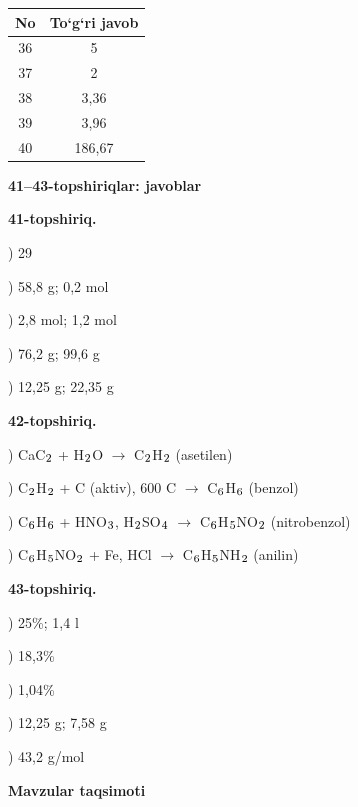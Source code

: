 \documentclass[11pt,a4paper]{article}
\renewcommand{\textsubscript}[1]{\ensuremath{_{\text{\fontsize{8}{8}\selectfont #1}}}}
\begin{document}
\noindent\begin{tabular}{|c|c|}\hline \textbf{No} & \textbf{To`g`ri javob}\\\hline
36 & 5\\\hline
37 & 2\\\hline
38 & 3,36\\\hline
39 & 3,96\\\hline
40 & 186,67\\\hline
\end{tabular}\par\medskip
\noindent\textbf{41--43-topshiriqlar: javoblar}\par\smallskip
\noindent\textbf{41-topshiriq.}\par
{}) 29\par
{}) 58,8 g; 0,2 mol\par
{}) 2,8 mol; 1,2 mol\par
{}) 76,2 g; 99,6 g\par
{}) 12,25 g; 22,35 g\par
\noindent\textbf{42-topshiriq.}\par
{}) CaC\textsubscript{2} + H\textsubscript{2}O $\to$ C\textsubscript{2}H\textsubscript{2} (asetilen)\par
{}) C\textsubscript{2}H\textsubscript{2} + C (aktiv), 600 \textdegree{}C $\to$ C\textsubscript{6}H\textsubscript{6} (benzol)\par
{}) C\textsubscript{6}H\textsubscript{6} + HNO\textsubscript{3}, H\textsubscript{2}SO\textsubscript{4} $\to$ C\textsubscript{6}H\textsubscript{5}NO\textsubscript{2} (nitrobenzol)\par
{}) C\textsubscript{6}H\textsubscript{5}NO\textsubscript{2} + Fe, HCl $\to$ C\textsubscript{6}H\textsubscript{5}NH\textsubscript{2} (anilin)\par
\noindent\textbf{43-topshiriq.}\par
{}) 25\%; 1,4 l\par
{}) 18,3\%\par
{}) 1,04\%\par
{}) 12,25 g; 7,58 g\par
{}) 43,2 g/mol\par
\par\bigskip\noindent\textbf{Mavzular taqsimoti}\par\smallskip
\end{document}
